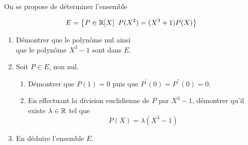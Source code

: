 \documentclass{report}
\begin{document}
\qs{}
{
On se propose de déterminer l'ensemble

\begin{equation*}
  E = \left\{P\in \mathbb{R}[X]\;\; P(X^2)=(X^3+1)P(X)\right\} 
\end{equation*}

\begin{enumerate}
  \item Démontrer que le polynôme nul ainsi\\  que le polynôme $X^3-1$ sont
    dans $E$.\\[4pt]
  \item Soit $P\in E$, non nul.
    \begin{enumerate}
      \small
    \item Démontrer que $P(1)=0$ puis que $P^{'}(0)=P^{''}(0)=0$.
    \item En effectuant la division euclidienne de $P$ par
      $X^3-1$, démontrer qu'il existe $\lambda\in \mathbb{R}$ tel que
      $$
      P(X) = \lambda (X^3-1)
      $$
    \end{enumerate}
  \item En déduire l'ensemble $E$.
\end{enumerate}
}
\end{document}
